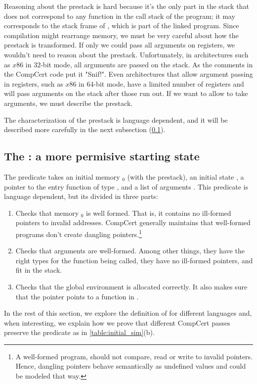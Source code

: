 Reasoning about the prestack is hard because it's the only part in the stack that does not correspond to any function in the call stack of the program; it may corresponds to the stack frame of , which is part of the linked program. Since compilation might rearrange memory, we must be very careful about how the prestack is transformed. If only we could pass all arguments on registers, we wouldn't need to reason about the prestack. 
Unfortunately, in architectures such as $x86$ in $32$-bit mode, all arguments are passed on the stack. As the comments in the CompCert code put it "Snif!"\cite{leroy19:compcert}. Even architectures that allow argument passing in registers, such as $x86$ in $64$-bit mode, have a limited number of registers and will pass arguments on the stack after those run out. If we want to allow \main to take arguments, we must describe the prestack.

The  characterization of the prestack is language dependent, and it will be described more carefully in the next subsection (\ref{sec:entry_point}).

\subsection{The : a more permisive starting state}\label{sec:entry_point}
The predicate  takes an initial memory $_0$ (with the prestack), an initial state , a pointer to the entry function  of type , and a list of arguments . This predicate is language dependent, but its divided in three parts:
\begin{enumerate}
\item Checks that memory  $_0$ is well formed. That is, it contains no ill-formed pointers to invalid addresses. CompCert generally maintains that well-formed programs don't create dangling pointers.\footnote{A well-formed program, should not compare, read or write to invalid pointers. Hence, dangling pointers behave semantically as undefined values and could be modeled that way.}
\item Checks that arguments are well-formed. Among other things, they have the right types for the function being called, they have no ill-formed pointers, and fit in the stack. 
\item Checks that the global environment  is allocated correctly. It also makes sure that the pointer  points to a function in .
\end{enumerate}
In the rest of this section, we explore the definition of  for different languages and, when interesting, we explain how we prove that different CompCert passes preserve the predicate as in \ref{table:initial_sim}(b).

